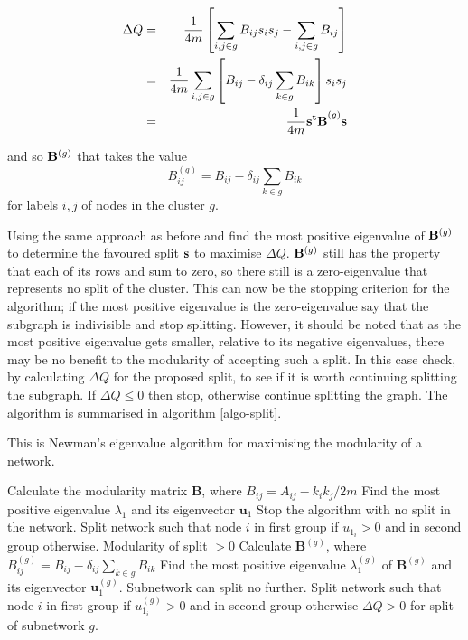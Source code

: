 \begin{samepage}
\begin{eqnarray}
\Delta Q & = & \frac{1}{4m}\left[ \sum_{i,j \in g} B_{ij}s_is_j - \sum_{i,j \in g}B_{ij}\right] \cr
& = & \frac{1}{4m}\sum_{i,j \in g}\left[ B_{ij} - \delta_{ij}\sum_{k \in g} B_{ik}\right]s_is_j \cr
& = & \frac{1}{4m}{\bf s^tB}^{(g)}{\bf s}
\end{eqnarray}
\end{samepage}
and so ${\bf B}^{(g)}$ that takes the value
\begin{equation}
B^{(g)}_{ij} = B_{ij} - \delta_{ij}\sum_{k \in g} B_{ik}
\end{equation}
for labels $i,j$ of nodes in the cluster $g$.

Using the same approach as before and find the most
positive eigenvalue of ${\bf B}^{(g)}$ to determine the favoured split
${\bf s}$ to maximise $\Delta Q$. ${\bf B}^{(g)}$ still has the
property that each of its rows and sum to zero, so there still is a
zero-eigenvalue that represents no split of the cluster.  This can
now be the stopping criterion for the algorithm; if the most positive eigenvalue is the
zero-eigenvalue say that the subgraph is indivisible and stop
splitting.  However, it should be noted that as the most
positive eigenvalue gets smaller, relative to its negative
eigenvalues, there may be no benefit to the modularity of accepting
such a split.  In this case  check, by calculating $\Delta Q$ for
the proposed split, to see if it is worth continuing splitting the subgraph.
If $\Delta Q \leq 0$ then stop, otherwise continue
splitting the graph.  The algorithm is summarised in algorithm \ref{algo-split}.

\begin{algorithm}
\caption{This is Newman's eigenvalue algorithm for maximising the modularity of a network.}
\label{algo-split}
\begin{algorithmic}
\STATE Calculate the modularity matrix $\mathbf{B}$, where $B_{ij} = A_{ij} - k_ik_j/2m$
\STATE Find the most positive eigenvalue $\lambda_1$ and its eigenvector $\mathbf{u}_1$
\STATE Stop the algorithm with no split in the network.
\ELSE
\STATE Split network such that node $i$ in first group if $u_{1_{i}} > 0$ and in second group otherwise.
\ENSURE Modularity of split $> 0$
\ENDIF
{}
\STATE Calculate $\mathbf{B}^{(g)}$, where $B^{(g)}_{ij} = B_{ij} - \delta_{ij}\sum_{k\in g}B_{ik}$
\STATE Find the most positive eigenvalue $\lambda^{(g)}_1$ of $\mathbf{B}^{(g)}$ and its eigenvector $\mathbf{u}^{(g)}_1$.
\STATE Subnetwork can split no further.
\ELSE
\STATE Split network such that node $i$ in first group if $u^{(g)}_{1_{i}} > 0$ and in second group otherwise
\ENSURE $\Delta Q > 0$ for split of subnetwork $g$.
\ENDIF
\ENDFOR
\end{algorithmic}
\end{algorithm}



